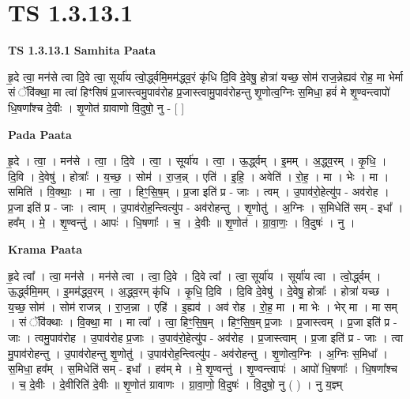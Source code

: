 \documentclass[17pt]{extarticle}
\begin{document}
\section{ TS 1.3.13.1 }

\textbf{TS 1.3.13.1 } \newline
\textbf{Samhita Paata} \newline

हृ॒दे त्वा॒ मन॑से त्वा दि॒वे त्वा॒ सूर्या॑य त्वो॒र्द्ध्वमि॒मम॑द्ध्व॒रं कृ॑धि दि॒वि दे॒वेषु॒ होत्रा॑ यच्छ॒ सोम॑ राज॒न्नेह्यव॑ रोह॒ मा भेर्मा सं ॅवि॑क्था॒ मा त्वा॑ हिꣳसिषं प्र॒जास्त्वमु॒पाव॑रोह प्र॒जास्त्वामु॒पाव॑रोहन्तु शृ॒णोत्व॒ग्निः स॒मिधा॒ हवं॑ मे शृ॒ण्वन्त्वापो॑ धि॒षणा᳚श्च दे॒वीः । शृ॒णोत॑ ग्रावाणो वि॒दुषो॒ नु - [ ] \newline

\textbf{Pada Paata} \newline

हृ॒दे । त्वा॒ । मन॑से । त्वा॒ । दि॒वे । त्वा॒ । सूर्या॑य । त्वा॒ । ऊ॒र्द्ध्वम् । इ॒मम् । अ॒द्ध्व॒रम् । कृ॒धि॒ । दि॒वि । दे॒वेषु॑ । होत्राः᳚ । य॒च्छ॒ । सोम॑ । रा॒ज॒न्न् । एति॑ । इ॒हि॒ । अवेति॑ । रो॒ह॒ । मा । भेः । मा । समिति॑ । वि॒क्थाः॒ । मा । त्वा॒ । हिꣳ॒॒सि॒ष॒म् । प्र॒जा इति॑ प्र - जाः । त्वम् । उ॒पाव॑रो॒हेत्यु॑प - अव॑रोह । प्र॒जा इति॑ प्र - जाः । त्वाम् । उ॒पाव॑रोह॒न्त्वित्यु॑प - अव॑रोहन्तु । शृ॒णोतु॑ । अ॒ग्निः । स॒मिधेति॑ सम् - इधा᳚ । हव᳚म् । मे॒ । शृ॒ण्वन्तु॑ । आपः॑ । धि॒षणाः᳚ । च॒ । दे॒वीः ॥ शृ॒णोत॑ । ग्रा॒वा॒णः॒ । वि॒दुषः॑ । नु ।  \newline


\textbf{Krama Paata} \newline

हृ॒दे त्वा᳚ । त्वा॒ मन॑से । मन॑से त्वा । त्वा॒ दि॒वे । दि॒वे त्वा᳚ । त्वा॒ सूर्या॑य । सूर्या॑य त्वा । त्वो॒र्द्ध्वम् । ऊ॒र्द्ध्वमि॒मम् । इ॒मम॑द्ध्व॒रम् । अ॒द्ध्व॒रम् कृ॑धि । कृ॒धि॒ दि॒वि । दि॒वि दे॒वेषु॑ । दे॒वेषु॒ होत्राः᳚ । होत्रा॑ यच्छ । य॒च्छ॒ सोम॑ । सोम॑ राजन्न् । रा॒ज॒न्ना । एहि॑ । इ॒ह्यव॑ । अव॑ रोह । रो॒ह॒ मा । मा भेः । भेर् मा । मा सम् । सं ॅवि॑क्थाः । वि॒क्था॒ मा । मा त्वा᳚ । त्वा॒ हिꣳ॒॒सि॒ष॒म् । हिꣳ॒॒सि॒ष॒म् प्र॒जाः । प्र॒जास्त्वम् । प्र॒जा इति॑ प्र - जाः । त्वमु॒पाव॑रोह । उ॒पाव॑रोह प्र॒जाः । उ॒पाव॑रो॒हेत्यु॑प - अव॑रोह । प्र॒जास्त्वाम् । प्र॒जा इति॑ प्र - जाः । त्वा मु॒पाव॑रोहन्तु । उ॒पाव॑रोहन्तु शृ॒णोतु॑ । उ॒पाव॑रोह॒न्त्वित्यु॑प - अव॑रोहन्तु । शृ॒णोत्व॒ग्निः । अ॒ग्निः स॒मिधा᳚ । स॒मिधा॒ हव᳚म् । स॒मिधेति॑ सम् - इधा᳚ । हव॑म् मे । मे॒ शृ॒ण्वन्तु॑ । शृ॒ण्वन्त्वापः॑ । आपो॑ धि॒षणाः᳚ । धि॒षणा᳚श्च । च॒ दे॒वीः । दे॒वीरिति॑ दे॒वीः ॥ शृ॒णोत॑ ग्रावाणः । ग्रा॒वा॒णो॒ वि॒दुषः॑ । वि॒दुषो॒ नु ( ) । नु य॒ज्ञ्म् \newline
\end{document}
